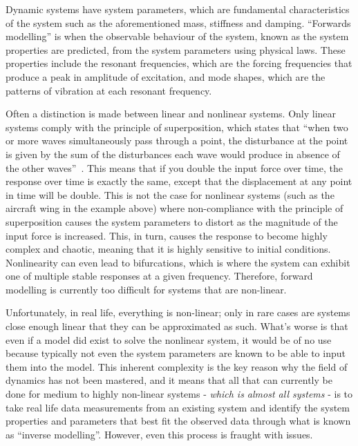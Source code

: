 \documentclass[12pt]{article}
\begin{document}
    Dynamic systems have system parameters, which are fundamental characteristics of the system such as the aforementioned mass, stiffness and damping.
    ``Forwards modelling'' is when the observable behaviour of the system, known as the system properties are predicted, from the system parameters using physical laws.
    These properties include the resonant frequencies, which are the forcing frequencies that produce a peak in amplitude of excitation, and mode shapes, which are the patterns of vibration at each resonant frequency.

    Often a distinction is made between linear and nonlinear systems.
    Only linear systems comply with the principle of superposition, which states that ``when two or more waves simultaneously pass through a point, the disturbance at the point is given by the sum of the disturbances each wave would produce in absence of the other waves''~\cite{StudyComSuperposition}.
    This means that if you double the input force over time, the response over time is exactly the same, except that the displacement at any point in time will be double.
    This is not the case for nonlinear systems (such as the aircraft wing in the example above) where non-compliance with the principle of superposition causes the system parameters to distort as the magnitude of the input force is increased.
    This, in turn, causes the response to become highly complex and chaotic, meaning that it is highly sensitive to initial conditions.
    Nonlinearity can even lead to bifurcations, which is where the system can exhibit one of multiple stable responses at a given frequency.
    Therefore, forward modelling is currently too difficult for systems that are non-linear.

    Unfortunately, in real life, everything is non-linear;
    only in rare cases are systems close enough linear that they can be approximated as such.
    What's worse is that even if a model did exist to solve the nonlinear system, it would be of no use because typically not even the system parameters are known to be able to input them into the model.
    This inherent complexity is the key reason why the field of dynamics has not been mastered, and it means that all that can currently be done for medium to highly non-linear systems - \textit{which is almost all systems} - is to take real life data measurements from an existing system and identify the system properties and parameters that best fit the observed data through what is known as ``inverse modelling''.
    However, even this process is fraught with issues.
\end{document}
